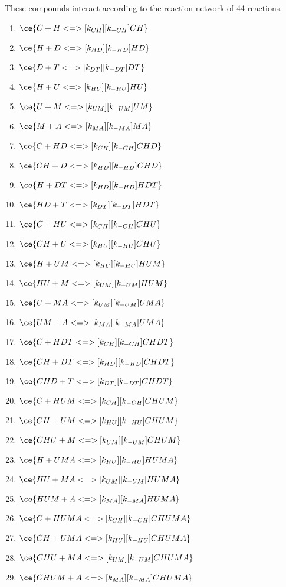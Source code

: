 These compounds interact according to the reaction network of 44 reactions.

\begin{enumerate}

\item $\ce{C + H <=>[k_{CH}][k_{-CH}] CH}$ %
\item $\ce{H + D <=>[k_{HD}][k_{-HD}] HD}$ %
\item $\ce{D + T <=>[k_{DT}][k_{-DT}] DT}$ %
\item $\ce{H + U <=>[k_{HU}][k_{-HU}] HU}$ %
\item $\ce{U + M <=>[k_{UM}][k_{-UM}] UM}$ %
\item $\ce{M + A <=>[k_{MA}][k_{-MA}] MA}$ %

\item $\ce{C + HD <=>[k_{CH}][k_{-CH}] CHD}$ %
\item $\ce{CH + D <=>[k_{HD}][k_{-HD}] CHD}$ %
\item $\ce{H + DT <=>[k_{HD}][k_{-HD}] HDT}$ %
\item $\ce{HD + T <=>[k_{DT}][k_{-DT}] HDT}$ %
\item $\ce{C + HU <=>[k_{CH}][k_{-CH}] CHU}$ %
\item $\ce{CH + U <=>[k_{HU}][k_{-HU}] CHU}$ %
\item $\ce{H + UM <=>[k_{HU}][k_{-HU}] HUM}$ %
\item $\ce{HU + M <=>[k_{UM}][k_{-UM}] HUM}$ %
\item $\ce{U + MA <=>[k_{UM}][k_{-UM}] UMA}$ %
\item $\ce{UM + A <=>[k_{MA}][k_{-MA}] UMA}$ %

\item $\ce{C + HDT <=>[k_{CH}][k_{-CH}] CHDT}$ %
\item $\ce{CH + DT <=>[k_{HD}][k_{-HD}] CHDT}$ %
\item $\ce{CHD + T <=>[k_{DT}][k_{-DT}] CHDT}$ %
\item $\ce{C + HUM <=>[k_{CH}][k_{-CH}] CHUM}$ %
\item $\ce{CH + UM <=>[k_{HU}][k_{-HU}] CHUM}$ %
\item $\ce{CHU + M <=>[k_{UM}][k_{-UM}] CHUM}$ %
\item $\ce{H + UMA <=>[k_{HU}][k_{-HU}] HUMA}$ %
\item $\ce{HU + MA <=>[k_{UM}][k_{-UM}] HUMA}$ %
\item $\ce{HUM + A <=>[k_{MA}][k_{-MA}] HUMA}$ %

\item $\ce{C + HUMA <=>[k_{CH}][k_{-CH}] CHUMA}$ %
\item $\ce{CH + UMA <=>[k_{HU}][k_{-HU}] CHUMA}$ %
\item $\ce{CHU + MA <=>[k_{UM}][k_{-UM}] CHUMA}$ %
\item $\ce{CHUM + A <=>[k_{MA}][k_{-MA}] CHUMA}$ %


\end{enumerate}
